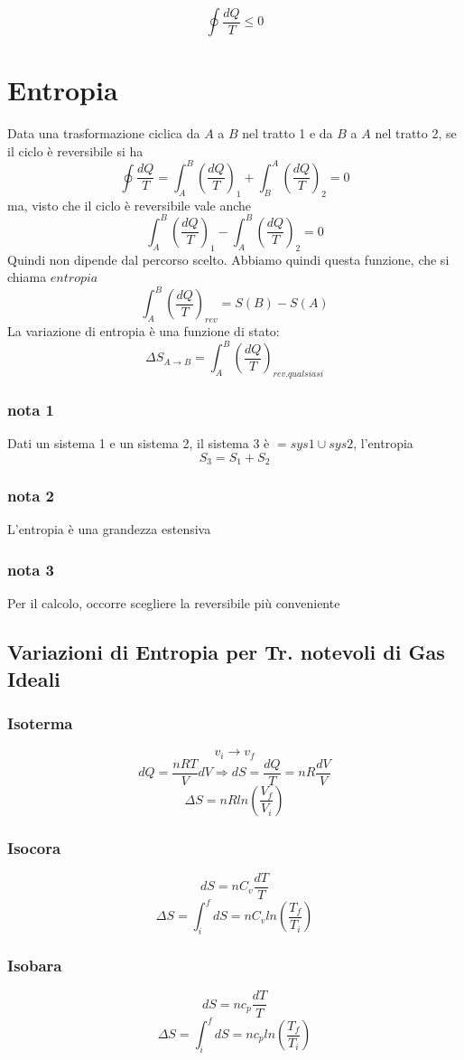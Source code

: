 \documentclass[a4paper]{report}
\begin{document}
  $$ \oint \frac{dQ}{T} \leq 0 $$

  \section{Entropia}
  Data una trasformazione ciclica da $A$ a $B$ nel tratto 1 e da $B$ a $A$ nel tratto 2, se il ciclo è reversibile si ha
  $$ \oint \frac{dQ}{T} = \int_A^B (\frac{dQ}{T})_1 + \int_B^A (\frac{dQ}{T})_2 = 0$$
  ma, visto che il ciclo è reversibile vale anche
  $$ \int_A^B (\frac{dQ}{T})_1 - \int_A^B (\frac{dQ}{T})_2 = 0$$
  Quindi non dipende dal percorso scelto. Abbiamo quindi questa funzione, che si chiama $entropia$
  $$ \int_A^B (\frac{dQ}{T})_{rev} = S(B) -S(A) $$
  La variazione di entropia è una funzione di stato:
  $$ \Delta S_{A \rightarrow B} = \int_A^B (\frac{dQ}{T})_{rev. qualsiasi} $$
  \subsubsection{nota 1}
  Dati un sistema 1 e un sistema 2, il sistema 3 è $= sys1 \cup sys2$, l'entropia
  $$ S_3 = S_1 + S_2 $$
  \subsubsection{nota 2}
  L'entropia è una grandezza estensiva
  \subsubsection{nota 3}
  Per il calcolo, occorre scegliere la reversibile più conveniente
  \subsection{Variazioni di Entropia per Tr. notevoli di Gas Ideali}
  \subsubsection{Isoterma}
  $$ v_i \rightarrow v_f$$
  $$ dQ = \frac{nRT}{V} dV \Rightarrow dS = \frac{dQ}{T} = nR\frac{dV}{V} $$
  $$ \Delta S = nR ln(\frac{V_f}{V_i}) $$

  \subsubsection{Isocora}
  $$ dS = nC_v\frac{dT}{T} $$
  $$ \Delta S = \int_i^f dS = nC_v ln(\frac{T_f}{T_i}) $$

  \subsubsection{Isobara}
  $$ dS = nc_p\frac{dT}{T} $$
  $$ \Delta S = \int_i^f dS = n c_p ln(\frac{T_f}{T_i})$$
\end{document}
